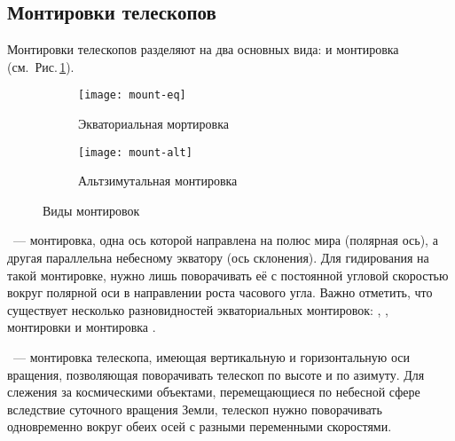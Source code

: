 \subsection{Монтировки телескопов}
Монтировки телескопов разделяют на два основных вида:  и  монтировка (см.~Рис.\,\ref{mounts}).
\begin{figure}[h]
	\centering
	\hspace*{.4cm}
	\begin{subfigure}{0.48\textwidth}
		\texttt{[image: mount-eq]}
		\caption{Экваториальная мортировка}
	 \end{subfigure}
	\hspace*{.4cm}
	\begin{subfigure}{0.41\textwidth}
		\texttt{[image: mount-alt]}
		\caption{Альтзимутальная монтировка}
	 \end{subfigure}
	 \hspace*{.4cm}
	 \caption{Виды монтировок}
	 \label{mounts}
\end{figure}

~--- монтировка, одна ось которой направлена на полюс мира (полярная ось), а другая параллельна небесному экватору (ось склонения). 
Для гидирования на такой монтировке, нужно лишь поворачивать её с постоянной угловой скоростью вокруг полярной оси в направлении роста часового угла. 
Важно отметить, что существует несколько разновидностей экваториальных монтировок: , ,  монтировки и монтировка .

~--- монтировка телескопа, имеющая вертикальную и горизонтальную оси вращения, позволяющая поворачивать телескоп по высоте и по азимуту. Для слежения за космическими объектами, перемещающиеся по небесной сфере вследствие суточного вращения Земли, телескоп нужно поворачивать одновременно вокруг обеих осей с разными переменными скоростями.